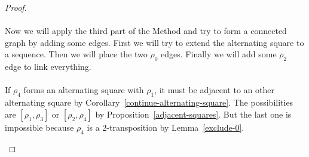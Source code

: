 \begin{proof}
\begin{figure}[H]
\begin{center}
\begin{tikzpicture}[scale=.8]
    \end{tikzpicture}
    \caption{}
    \label{proof-5-2}
  \end{center}
\end{figure}

\paragraph{}
Now we will apply the third part of the Method and try to form a connected graph by adding some edges. First we will try to extend the alternating square to a sequence. Then we will place the two $\rho_0$ edges. Finally we will add some $\rho_2$ edge to link everything.

\paragraph{}
If $\rho_4$ forms an alternating square with $\rho_1$, it must be adjacent to an other alternating square by Corollary~\ref{continue-alternating-square}. The possibilities are $[\rho_1, \rho_3]$ or $[\rho_2, \rho_4]$ by Proposition~\ref{adjacent-squares}. But the last one is impossible because $\rho_4$ is a 2-transposition by Lemma~\ref{exclude-0}.

\begin{figure}[H]
  \begin{center}
\end{center}
\end{figure}
\end{proof}
